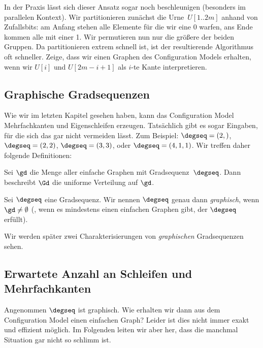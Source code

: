 \begin{exercise}
    In der Praxis lässt sich dieser Ansatz sogar noch beschleunigen (besonders im parallelen Kontext).
    Wir partitionieren zunächst die Urne~$U[1..2m]$ anhand von Zufallsbits:
    am Anfang stehen alle Elemente für die wir eine 0 warfen, ans Ende kommen alle mit einer 1.
    Wir permutieren nun nur die größere der beiden Gruppen.
    Da partitionieren extrem schnell ist, ist der resultierende Algorithmus oft schneller.
    Zeige, dass wir einen Graphen des Configuration Models erhalten, wenn wir $U[i]$ und $U[2m - i + 1]$ als $i$-te Kante interpretieren.
\end{exercise}

\subsection{Graphische Gradsequenzen}
Wie wir im letzten Kapitel gesehen haben, kann das Configuration Model Mehrfachkanten und Eigenschleifen erzeugen.
Tatsächlich gibt es sogar Eingaben, für die sich das gar nicht vermeiden lässt.
Zum Beispiel: $\degseq = (2,)$, $\degseq = (2, 2)$, $\degseq = (3,3)$, oder $\degseq = (4, 1, 1)$.
Wir treffen daher folgende Definitionen:

\begin{definition}
    Sei $\gd$ die Menge aller einfache Graphen mit Gradsequenz~$\degseq$.
    Dann beschreibt $\Gd$ die uniforme Verteilung auf $\gd$.
\end{definition}

\begin{definition}
    Sei $\degseq$ eine Gradsequenz.
    Wir nennen $\degseq$ genau dann \emph{graphisch}, wenn $\gd \neq \emptyset$ (\dh, wenn es mindestens einen einfachen Graphen gibt, der $\degseq$ erfüllt).
\end{definition}

\noindent
Wir werden später zwei Charakterisierungen von \emph{graphischen} Gradsequenzen sehen.

\subsection{Erwartete Anzahl an Schleifen und Mehrfachkanten}\label{subsec:anzahl-illegaler-kanten}
Angenommen $\degseq$ ist graphisch.
Wie erhalten wir dann aus dem Configuration Model einen einfachen Graph?
Leider ist dies nicht immer exakt und effizient möglich.
Im Folgenden leiten wir aber her, dass die manchmal Situation gar nicht so schlimm ist.


